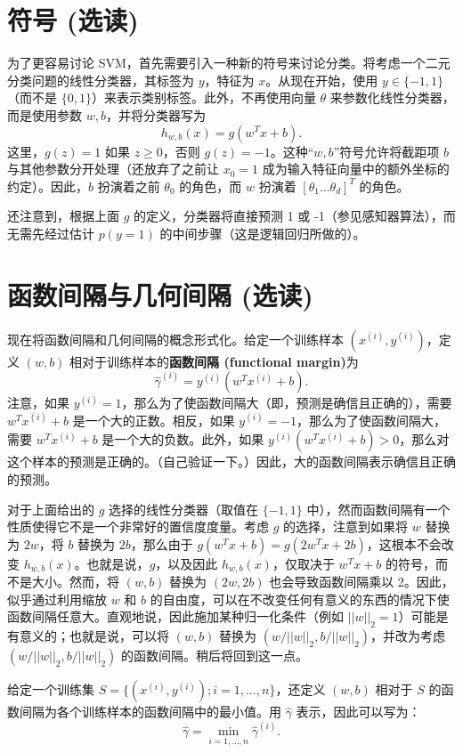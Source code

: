 \section{符号 (选读)}

为了更容易讨论 SVM，首先需要引入一种新的符号来讨论分类。将考虑一个二元分类问题的线性分类器，其标签为 $y$，特征为 $x$。从现在开始，使用 $y \in \{-1, 1\}$（而不是 $\{0, 1\}$）来表示类别标签。此外，不再使用向量 $\theta$ 来参数化线性分类器，而是使用参数 $w, b$，并将分类器写为
\[
    h_{w,b}(x) = g(w^T x + b).
\]
这里，$g(z) = 1$ 如果 $z \ge 0$，否则 $g(z) = -1$。这种“$w, b$”符号允许将截距项 $b$ 与其他参数分开处理（还放弃了之前让 $x_0 = 1$ 成为输入特征向量中的额外坐标的约定）。因此，$b$ 扮演着之前 $\theta_0$ 的角色，而 $w$ 扮演着 $[\theta_1 \dots \theta_d]^T$ 的角色。

还注意到，根据上面 $g$ 的定义，分类器将直接预测 1 或 -1（参见感知器算法），而无需先经过估计 $p(y=1)$ 的中间步骤（这是逻辑回归所做的）。

\section{函数间隔与几何间隔 (选读)}\label{sec:6.3}

现在将函数间隔和几何间隔的概念形式化。给定一个训练样本 $(x^{(i)}, y^{(i)})$，定义 $(w,b)$ 相对于训练样本的\textbf{函数间隔 (functional margin)}为
\[
    \hat{\gamma}^{(i)} = y^{(i)}(w^T x^{(i)} + b).
\]
注意，如果 $y^{(i)} = 1$，那么为了使函数间隔大（即，预测是确信且正确的），需要 $w^T x^{(i)} + b$ 是一个大的正数。相反，如果 $y^{(i)} = -1$，那么为了使函数间隔大，需要 $w^T x^{(i)} + b$ 是一个大的负数。此外，如果 $y^{(i)}(w^T x^{(i)} + b) > 0$，那么对这个样本的预测是正确的。（自己验证一下。）因此，大的函数间隔表示确信且正确的预测。

对于上面给出的 $g$ 选择的线性分类器（取值在 $\{-1, 1\}$ 中），然而函数间隔有一个性质使得它不是一个非常好的置信度度量。考虑 $g$ 的选择，注意到如果将 $w$ 替换为 $2w$，将 $b$ 替换为 $2b$，那么由于 $g(w^T x + b) = g(2w^T x + 2b)$，这根本不会改变 $h_{w,b}(x)$。也就是说，$g$，以及因此 $h_{w,b}(x)$，仅取决于 $w^T x + b$ 的符号，而不是大小。然而，将 $(w,b)$ 替换为 $(2w, 2b)$ 也会导致函数间隔乘以 2。因此，似乎通过利用缩放 $w$ 和 $b$ 的自由度，可以在不改变任何有意义的东西的情况下使函数间隔任意大。直观地说，因此施加某种归一化条件（例如 $||w||_2 = 1$）可能是有意义的；也就是说，可以将 $(w,b)$ 替换为 $(w/||w||_2, b/||w||_2)$，并改为考虑 $(w/||w||_2, b/||w||_2)$ 的函数间隔。稍后将回到这一点。

给定一个训练集 $S = \{(x^{(i)}, y^{(i)}); i = 1, \dots, n\}$，还定义 $(w,b)$ 相对于 $S$ 的函数间隔为各个训练样本的函数间隔中的最小值。用 $\hat{\gamma}$ 表示，因此可以写为：
\[
    \hat{\gamma} = \min_{i=1,\dots,n} \hat{\gamma}^{(i)}.
\]

